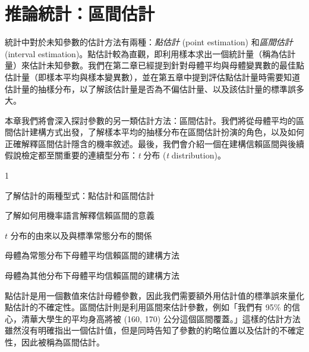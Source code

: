 \chapter{推論統計：區間估計}

    統計中對於未知參數的估計方法有兩種：\textit{點估計} (point estimation) 和\textit{區間估計} (interval estimation)。點估計較為直觀，即利用樣本求出一個統計量（稱為估計量）來估計未知參數。我們在第二章已經提到針對母體平均與母體變異數的最佳點估計量（即樣本平均與樣本變異數），並在第五章中提到評估點估計量時需要知道估計量的抽樣分布，以了解該估計量是否為不偏估計量、以及該估計量的標準誤多大。

    \medskip
    
    本章我們將會深入探討參數的另一類估計方法：區間估計。我們將從母體平均的區間估計建構方式出發，了解樣本平均的抽樣分布在區間估計扮演的角色，以及如何正確解釋區間估計隱含的機率敘述。最後，我們會介紹一個在建構信賴區間與後續假說檢定都至關重要的連續型分布：\textit{t} 分布 (\textit{t} distribution)。
    
    \begin{introduction}{1}
        \item 了解估計的兩種型式：點估計和區間估計
        \item 了解如何用機率語言解釋信賴區間的意義
        \item $t$ 分布的由來以及與標準常態分布的關係
        \item 母體為常態分布下母體平均信賴區間的建構方法
        \item 母體為其他分布下母體平均信賴區間的建構方法
    \end{introduction}

    點估計是用一個數值來估計母體參數，因此我們需要額外用估計值的標準誤來量化點估計的不確定性。區間估計則是利用區間來估計參數，例如「我們有 95\% 的信心，清華大學生的平均身高將被 (160, 170) 公分這個區間覆蓋。」這樣的估計方法雖然沒有明確指出一個估計值，但是同時告知了參數的約略位置以及估計的不確定性，因此被稱為區間估計。

    \medskip
    
